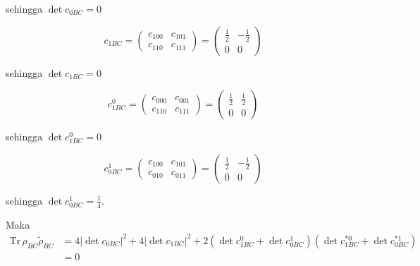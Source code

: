 \begin{enumerate}
	sehingga $\det c_{0BC} = 0$
	
	\begin{equation}
		c_{1BC}=
		\begin{pmatrix}
			c_{100} & c_{101} \\
			c_{110} & c_{111}
		\end{pmatrix}=
		\begin{pmatrix}
			\frac{1}{2} & -\frac{1}{2} \\
			0 & 0
		\end{pmatrix}
	\end{equation}
	
	sehingga $\det c_{1BC} = 0$
	
	\begin{equation}
		c_{1BC}^0=
		\begin{pmatrix}
			c_{000} & c_{001} \\
			c_{110} & c_{111}
		\end{pmatrix}=
		\begin{pmatrix}
			\frac{1}{2} & \frac{1}{2} \\
			0 & 0
		\end{pmatrix}
	\end{equation}
	
	sehingga $\det c_{1BC}^0 = 0$
	
	\begin{equation}
		c_{0BC}^1=
		\begin{pmatrix}
			c_{100} & c_{101} \\
			c_{010} & c_{011}
		\end{pmatrix}=
		\begin{pmatrix}
			\frac{1}{2} & -\frac{1}{2} \\
			0 & 0
		\end{pmatrix}
	\end{equation}
	
	sehingga $\det c_{0BC}^1 = \frac{1}{4}$.
	
	Maka
	\begin{equation}
		\begin{aligned}
			\mathrm{Tr}\,\rho_{BC}\tilde{\rho}_{BC}
			&=4|\det c_{0BC}|^2+4|\det c_{1BC}|^2+2(\det c_{1BC}^0+ \det c_{0BC}^1)(\det c^{*0}_{1BC} + \det c^{*1}_{0BC})\\
			&=0
		\end{aligned}
	\end{equation}
\end{enumerate}


